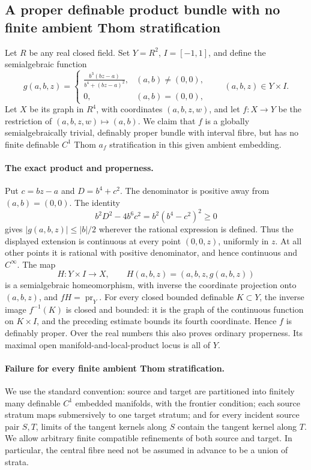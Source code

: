 \subsection*{A proper definable product bundle with no finite ambient Thom stratification}

Let $R$ be any real closed field. Set $Y=R^2$, $I=[-1,1]$, and define
the semialgebraic function
\[
 g(a,b,z)=
 \begin{cases}
 \displaystyle\frac{b^3(bz-a)}{b^4+(bz-a)^2},&(a,b)\ne(0,0),\\
 0,&(a,b)=(0,0),
 \end{cases}
 \qquad (a,b,z)\in Y\times I.
 \tag{MT.1}
\]
Let $X$ be its graph in $R^4$, with coordinates $(a,b,z,w)$, and let
$f:X\to Y$ be the restriction of $(a,b,z,w)\mapsto(a,b)$.
We claim that $f$ is a globally semialgebraically trivial, definably
proper bundle with interval fibre, but has no finite definable $C^1$
Thom $a_f$ stratification in this given ambient embedding.

\paragraph{The exact product and properness.}
Put $c=bz-a$ and $D=b^4+c^2$. The denominator is positive away
from $(a,b)=(0,0)$. The identity
\[
 b^2D^2-4b^6c^2=b^2(b^4-c^2)^2\ge0
\]
gives $|g(a,b,z)|\le |b|/2$ wherever the rational expression is
defined. Thus the displayed extension is continuous at every point
$(0,0,z)$, uniformly in $z$. At all other points it is rational with
positive denominator, and hence continuous and $C^\infty$.
The map
\[
 H:Y\times I\longrightarrow X,\qquad
 H(a,b,z)=(a,b,z,g(a,b,z))
 \tag{MT.2}
\]
is a semialgebraic homeomorphism, with inverse the coordinate
projection onto $(a,b,z)$, and $fH=\operatorname{pr}_Y$.
For every closed bounded definable $K\subset Y$, the inverse
image $f^{-1}(K)$ is closed and bounded: it is the graph of the
continuous function on $K\times I$, and the preceding estimate
bounds its fourth coordinate. Hence $f$ is definably proper.
Over the real numbers this also proves ordinary properness.
Its maximal open manifold-and-local-product locus is all of $Y$.

\paragraph{Failure for every finite ambient Thom stratification.}
We use the standard convention: source and target are partitioned
into finitely many definable $C^1$ embedded manifolds, with the
frontier condition; each source stratum maps submersively to one
target stratum; and for every incident source pair $S,T$, limits
of the tangent kernels along $S$ contain the tangent kernel along
$T$. We allow arbitrary finite compatible refinements of both
source and target. In particular, the central fibre need not be
assumed in advance to be a union of strata.

